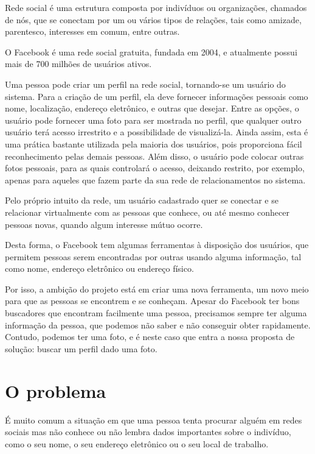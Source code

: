 \documentclass[10pt,a4paper]{article}
\begin{document}
	Rede social é uma estrutura composta por indivíduos ou organizações, chamados de nós, que se conectam por um ou vários tipos de relações, tais como amizade, parentesco, interesses em comum, entre outras.
	
	O Facebook é uma rede social gratuita, fundada em 2004, e atualmente possui mais de 700 milhões de usuários ativos.

	Uma pessoa pode criar um perfil na rede social, tornando-se um
        usuário do sistema. Para a criação de um perfil, ela deve
        fornecer informações pessoais como nome, localização, endereço
        eletrônico, e outras que desejar. Entre as opções, o usuário
        pode fornecer uma foto para ser mostrada no perfil, que
        qualquer outro usuário terá acesso irrestrito e a
        possibilidade de visualizá-la. Ainda assim, esta é uma prática
        bastante utilizada pela maioria dos usuários, pois proporciona
        fácil reconhecimento pelas demais pessoas. Além disso, o
        usuário pode colocar outras fotos pessoais, para as quais
        controlará o acesso, deixando restrito, por exemplo, apenas para aqueles que fazem parte da sua rede de relacionamentos no sistema.

	Pelo próprio intuito da rede, um usuário cadastrado quer se conectar e se relacionar virtualmente com as pessoas que conhece, ou até mesmo conhecer pessoas novas, quando algum interesse mútuo ocorre.

	Desta forma, o Facebook tem algumas ferramentas à disposição dos usuários, que permitem pessoas serem encontradas por outras usando alguma informação, tal como nome, endereço eletrônico ou endereço físico.

	Por isso, a ambição do projeto está em criar uma nova
        ferramenta, um novo meio para que as pessoas se encontrem e se
        conheçam. Apesar do Facebook ter bons buscadores que encontram
        facilmente uma pessoa, precisamos sempre ter alguma informação
        da pessoa, que podemos não saber e não conseguir obter
        rapidamente. Contudo, podemos ter uma foto, e é neste caso que
        entra a nossa proposta de solução: buscar um perfil dado uma
        foto.
\newpage
  \section{O problema}
É muito comum a situação em que uma pessoa tenta procurar alguém em redes sociais mas não conhece ou não lembra dados importantes sobre o indivíduo, como o seu nome, o seu endereço eletrônico ou o seu local de trabalho.
\end{document}
